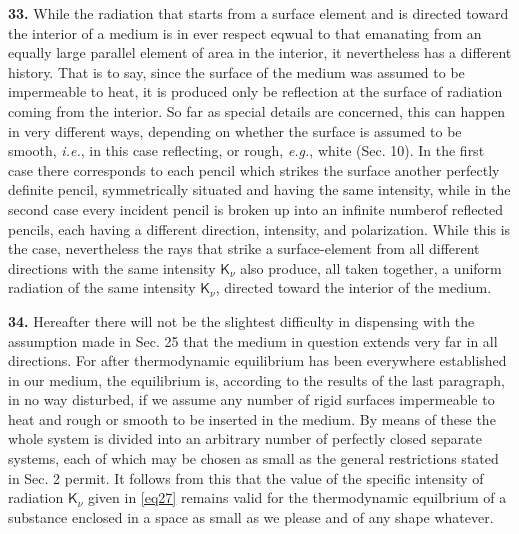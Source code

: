 \documentclass[12pt,oneside]{book}
\begin{document}
\textbf{33.} While the radiation that starts from a surface element and is directed toward the interior of a medium is in ever respect eqwual to that emanating from an equally large parallel element of area in the interior, it nevertheless has a different history. That is to say, since the surface of the medium was assumed to be impermeable to heat, it is produced only be reflection at the surface of radiation coming from the interior. So far as special details are concerned, this can happen in very different ways, depending on whether the surface is assumed to be smooth, \textit{i.e.}, in this case reflecting, or rough, \textit{e.g.}, white (Sec. 10). In the first case there corresponds to each pencil which strikes the surface another perfectly definite pencil, symmetrically situated and having the same intensity, while in the second case every incident pencil is broken up into an infinite numberof reflected pencils, each having a different direction, intensity, and polarization. While this is the case, nevertheless the rays that strike a surface-element from all different directions with the same intensity $\mathsf{K}_\nu$ also produce, all taken together, a uniform radiation of the same intensity $\mathsf{K}_\nu$, directed toward the interior of the medium. \par

\textbf{34.} Hereafter there will not be the slightest difficulty in dispensing with the assumption made in Sec. 25 that the medium in question extends very far in all directions. For after thermodynamic equilibrium has been everywhere established in our medium, the equilibrium is, according to the results of the last paragraph, in no way disturbed, if we assume any number of rigid surfaces impermeable to heat and rough or smooth to be inserted in the medium. By means of these the whole system is divided into an arbitrary number of perfectly closed separate systems, each of which may be chosen as small as the general restrictions stated in Sec. 2 permit. It follows from this that the value of the specific intensity of radiation $\mathsf{K}_\nu$ given in \eqref{eq27} remains valid for the thermodynamic equilbrium of a substance enclosed in a space as small as we please and of any shape whatever. \par
\end{document}

